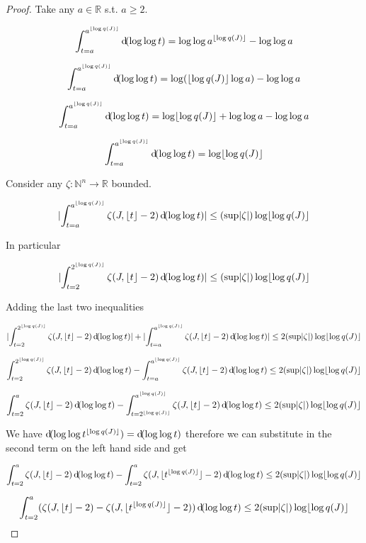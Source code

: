 \documentclass{article}
\numberwithin{equation}{section}
\theoremstyle{definition}
\theoremstyle{plain}
\newcommand{\Nats}{\mathbb{N}}
\newcommand{\Reals}{\mathbb{R}}
\newcommand{\NatFun}{\Nats^n \rightarrow}
\newcommand{\Abs}[1]{\lvert #1 \rvert}
\newcommand{\Floor}[1]{\lfloor #1 \rfloor}
\begin{document}
\begin{proof}

Take any ${a \in \Reals}$ s.t. ${a \geq 2}$.

\[\int_{t = a}^{a^{\Floor{\log q(J)}}} \dif (\log \log t) = \log \log a^{\Floor{\log q(J)}} - \log \log a\]

\[\int_{t = a}^{a^{\Floor{\log q(J)}}} \dif (\log \log t) = \log (\Floor{\log q(J)} \log a) - \log \log a\]

\[\int_{t = a}^{a^{\Floor{\log q(J)}}} \dif (\log \log t) = \log \Floor{\log q(J)} + \log \log a - \log \log a\]

\[\int_{t = a}^{a^{\Floor{\log q(J)}}} \dif (\log \log t) = \log \Floor{\log q(J)}\]

Consider any ${\zeta: \NatFun \Reals}$ bounded.

\[\Abs{\int_{t = a}^{a^{\Floor{\log q(J)}}} \zeta(J,\Floor{t}-2) \dif (\log \log t)} \leq (\sup \Abs{\zeta}) \log \Floor{\log q(J)}\]

In particular

\[\Abs{\int_{t = 2}^{2^{\Floor{\log q(J)}}} \zeta(J,\Floor{t}-2) \dif (\log \log t)} \leq (\sup \Abs{\zeta}) \log \Floor{\log q(J)}\]

Adding the last two inequalities

\[\Abs{\int_{t = 2}^{2^{\Floor{\log q(J)}}} \zeta(J,\Floor{t}-2) \dif (\log \log t)} + \Abs{\int_{t = a}^{a^{\Floor{\log q(J)}}} \zeta(J,\Floor{t}-2) \dif (\log \log t)} \leq 2(\sup \Abs{\zeta}) \log \Floor{\log q(J)}\]

\[\int_{t = 2}^{2^{\Floor{\log q(J)}}} \zeta(J,\Floor{t}-2) \dif (\log \log t) - \int_{t = a}^{a^{\Floor{\log q(J)}}} \zeta(J,\Floor{t}-2) \dif (\log \log t) \leq 2(\sup \Abs{\zeta}) \log \Floor{\log q(J)}\]

\[\int_{t = 2}^{a} \zeta(J,\Floor{t}-2) \dif (\log \log t) - \int_{t=2^{\Floor{\log q(J)}}}^{a^{\Floor{\log q(J)}}} \zeta(J,\Floor{t}-2) \dif (\log \log t) \leq 2(\sup \Abs{\zeta}) \log \Floor{\log q(J)}\]

We have ${\dif (\log \log t^{\Floor{\log q(J)}}) = \dif(\log \log t)}$ therefore we can substitute in the second term on the left hand side and get

\[\int_{t = 2}^{a} \zeta(J,\Floor{t}-2) \dif (\log \log t) - \int_{t=2}^{a} \zeta(J,\Floor{t^{\Floor{\log q(J)}}}-2) \dif (\log \log t) \leq 2(\sup \Abs{\zeta}) \log \Floor{\log q(J)}\]

\[\int_{t = 2}^{a} (\zeta(J,\Floor{t}-2) - \zeta(J,\Floor{t^{\Floor{\log q(J)}}}-2)) \dif (\log \log t) \leq 2(\sup \Abs{\zeta}) \log \Floor{\log q(J)}\]


\end{proof}
\end{document}
